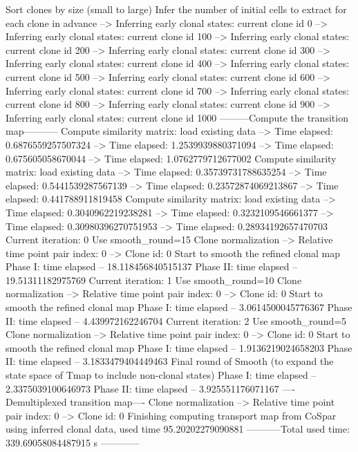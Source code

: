 \documentclass[letterpaper,10pt,english]{sphinxmanual}
\begin{document}
{\begin{sphinxVerbatim}[commandchars=\\\{\}]
Sort clones by size (small to large)
Infer the number of initial cells to extract for each clone in advance
--> Inferring early clonal states: current clone id 0
--> Inferring early clonal states: current clone id 100
--> Inferring early clonal states: current clone id 200
--> Inferring early clonal states: current clone id 300
--> Inferring early clonal states: current clone id 400
--> Inferring early clonal states: current clone id 500
--> Inferring early clonal states: current clone id 600
--> Inferring early clonal states: current clone id 700
--> Inferring early clonal states: current clone id 800
--> Inferring early clonal states: current clone id 900
--> Inferring early clonal states: current clone id 1000
---------Compute the transition map-----------
Compute similarity matrix: load existing data
--> Time elapsed:  0.6876559257507324
--> Time elapsed:  1.2539939880371094
--> Time elapsed:  0.675605058670044
--> Time elapsed:  1.0762779712677002
Compute similarity matrix: load existing data
--> Time elapsed:  0.35739731788635254
--> Time elapsed:  0.5441539287567139
--> Time elapsed:  0.23572874069213867
--> Time elapsed:  0.441788911819458
Compute similarity matrix: load existing data
--> Time elapsed:  0.3040962219238281
--> Time elapsed:  0.3232109546661377
--> Time elapsed:  0.30980396270751953
--> Time elapsed:  0.28934192657470703
Current iteration: 0
Use smooth\_round=15
Clone normalization
--> Relative time point pair index: 0
--> Clone id: 0
Start to smooth the refined clonal map
Phase I: time elapsed --  18.118456840515137
Phase II: time elapsed --  19.51311182975769
Current iteration: 1
Use smooth\_round=10
Clone normalization
--> Relative time point pair index: 0
--> Clone id: 0
Start to smooth the refined clonal map
Phase I: time elapsed --  3.0614500045776367
Phase II: time elapsed --  4.439972162246704
Current iteration: 2
Use smooth\_round=5
Clone normalization
--> Relative time point pair index: 0
--> Clone id: 0
Start to smooth the refined clonal map
Phase I: time elapsed --  1.9136219024658203
Phase II: time elapsed --  3.1833479404449463
Final round of Smooth (to expand the state space of Tmap to include non-clonal states)
Phase I: time elapsed --  2.3375039100646973
Phase II: time elapsed --  3.925551176071167
----Demultiplexed transition map----
Clone normalization
--> Relative time point pair index: 0
--> Clone id: 0
Finishing computing transport map from CoSpar using inferred clonal data, used time 95.20202279090881
-----------Total used time: 339.69058084487915 s ------------
\end{sphinxVerbatim}
}
\end{document}
